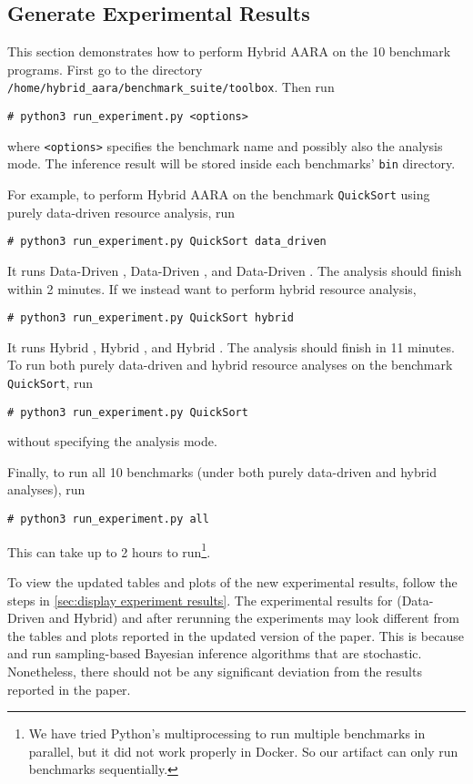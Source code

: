 \subsection{Generate Experimental Results}
\label{sec:generate experiment results}

This section demonstrates how to perform Hybrid AARA on the 10 benchmark
programs.
%
First go to the directory \texttt{/home/hybrid\_aara/benchmark\_suite/toolbox}.
%
Then run
\begin{verbatim}
# python3 run_experiment.py <options>
\end{verbatim}
where \texttt{<options>} specifies the benchmark name and possibly also the
analysis mode.
%
The inference result will be stored inside each benchmarks' \texttt{bin}
directory.

For example, to perform Hybrid AARA on the benchmark \texttt{QuickSort} using
purely data-driven resource analysis, run
\begin{verbatim}
# python3 run_experiment.py QuickSort data_driven
\end{verbatim}
%
It runs Data-Driven \Opt{}, Data-Driven \BayesWC{}, and Data-Driven \BayesPC{}.
%
The analysis should finish within 2 minutes.
%
If we instead want to perform hybrid resource analysis,
\begin{verbatim}
# python3 run_experiment.py QuickSort hybrid
\end{verbatim}
%
It runs Hybrid \Opt{}, Hybrid \BayesWC{}, and Hybrid \BayesPC{}.
%
The analysis should finish in 11 minutes.
%
To run both purely data-driven and hybrid resource analyses on the benchmark
\texttt{QuickSort}, run
\begin{verbatim}
# python3 run_experiment.py QuickSort
\end{verbatim}
without specifying the analysis mode.

Finally, to run all 10 benchmarks (under both purely data-driven and hybrid
analyses), run
\begin{verbatim}
# python3 run_experiment.py all
\end{verbatim}
This can take up to 2 hours to run\footnote{We have tried Python's
  multiprocessing to run multiple benchmarks in parallel, but it did not work
  properly in Docker. So our artifact can only run benchmarks sequentially.}.

To view the updated tables and plots of the new experimental results, follow the
steps in \cref{sec:display experiment results}.
%
The experimental results for (Data-Driven and Hybrid) \BayesWC{} and \BayesPC{}
after rerunning the experiments may look different from the tables and plots
reported in the updated version of the paper.
%
This is because \BayesWC{} and \BayesPC{} run sampling-based Bayesian inference
algorithms that are stochastic.
%
Nonetheless, there should not be any significant deviation from the results
reported in the paper.

